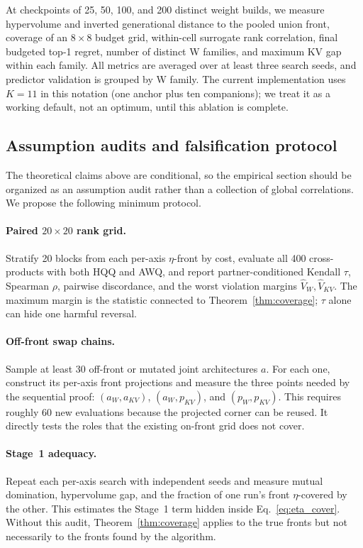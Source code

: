 At checkpoints of 25, 50, 100, and 200 distinct weight builds, we measure
hypervolume and inverted generational distance to the pooled union front,
coverage of an $8\times8$ budget grid, within-cell surrogate rank correlation,
final budgeted top-1 regret, number of distinct W families, and maximum KV gap
within each family.  All metrics are averaged over at least three search seeds,
and predictor validation is grouped by W family.  The current implementation
uses $K=11$ in this notation (one anchor plus ten companions); we treat it as a
working default, not an optimum, until this ablation is complete.

\subsection{Assumption audits and falsification protocol}
\label{sec:analysis_protocol}

The theoretical claims above are conditional, so the empirical section should
be organized as an assumption audit rather than a collection of global
correlations.  We propose the following minimum protocol.

\paragraph{Paired $20\times20$ rank grid.}
Stratify 20 blocks from each per-axis $\eta$-front by cost, evaluate all 400
cross-products with both HQQ and AWQ, and report partner-conditioned Kendall
$\tau$, Spearman $\rho$, pairwise discordance, and the worst violation margins
$\widehat V_W,\widehat V_{KV}$.  The maximum margin is the statistic connected
to Theorem~\ref{thm:coverage}; $\tau$ alone can hide one harmful reversal.

\paragraph{Off-front swap chains.}
Sample at least 30 off-front or mutated joint architectures $a$.  For each one,
construct its per-axis front projections and measure the three points needed by
the sequential proof: $(a_W,a_{KV})$, $(a_W,p_{KV})$, and
$(p_W,p_{KV})$.  This requires roughly 60 new evaluations because the projected
corner can be reused.  It directly tests the roles that the existing on-front
grid does not cover.

\paragraph{Stage~1 adequacy.}
Repeat each per-axis search with independent seeds and measure mutual domination,
hypervolume gap, and the fraction of one run's front $\eta$-covered by the other.
This estimates the Stage~1 term hidden inside Eq.~\eqref{eq:eta_cover}.  Without
this audit, Theorem~\ref{thm:coverage} applies to the true fronts but not
necessarily to the fronts found by the algorithm.

